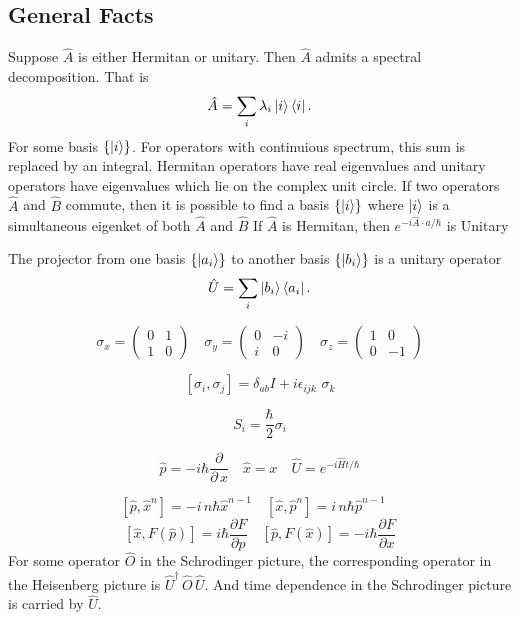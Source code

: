 \documentclass{article}
\begin{document}
  \twocolumn
    \subsection*{General Facts}
      Suppose $\hat{A}$ is either Hermitan or unitary. Then  $\hat{A}$ admits a 
      spectral decomposition. That is 
      \[
         \hat{A} = \sum_i \lambda_i \ket{i}\bra{i}
      .\] 
      For some basis $\{\ket{i} \}$. For operators with continuious spectrum,
      this sum is replaced by an integral. 
      Hermitan operators have real eigenvalues and unitary operators 
      have eigenvalues which lie on the complex unit circle.
      If two operators $\hat{A}$ and  $\hat{B}$ commute, then it is possible 
      to find a basis  $\{\ket{i}\}$ where $ \ket{i}$ is a simultaneous eigenket
      of both $\hat{A}$ and  $\hat{B}$
      If $\hat{A}$ is Hermitan, then  $e^{-i \hat{A} \cdot a / \hbar}$
      is Unitary

      The projector from one basis $ \{\ket{a_i}\}$ to another basis 
      $\{\ket{b_i}\}$ is a unitary operator \[
        \hat{U} = \sum_i \ket{b_i}\bra{a_i}
      .\] 
        
    \[
      \sigma_x = \begin{pmatrix} 0 & 1 \\ 1 & 0 \end{pmatrix} \quad
      \sigma_y = \begin{pmatrix} 0 & -i \\ i & 0 \end{pmatrix} \quad
      \sigma_z = \begin{pmatrix} 1 & 0 \\ 0 & -1 \end{pmatrix}
    \]
 
    \[ 
      [\sigma_i,\sigma_j] = \delta_{a b}I + i \epsilon_{ijk}\,\,\sigma_k
    \]

    \[
      S_i = \frac{\hbar}{2}\sigma_i 
    \]

    \[
      \hat{p} = - i \hbar \frac{\partial}{\partial\,x} \quad
      \hat{x} = x \quad
      \hat{U} = e^{-i \hat{H} t / \hbar}
    \]
    
    \[
      [\hat{p},\hat{x}^n] = -i \,n \hbar \hat{x}^{n-1} \quad
      [\hat{x},\hat{p}^n] = i\,n  \hbar \hat{p}^{n-1} \quad
    \]
    \[
      [\hat{x},F(\hat{p})] = i \hbar \frac{\partial F}{\partial p} \quad
      [\hat{p},F(\hat{x})] =-i \hbar \frac{\partial F}{\partial x}
    \] 
    For some operator \(\hat{O}\) in the Schrodinger picture,
    the corresponding operator in the Heisenberg picture is 
    \(\hat{U}^\dagger\, \hat{O} \, \hat{U}\). And time dependence 
    in the Schrodinger picture is carried by \(\hat{U}\).
    
\end{document}
